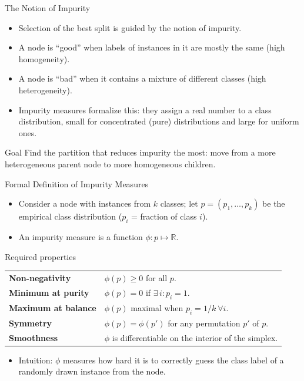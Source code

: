\begin{frame}{The Notion of Impurity}
  \begin{itemize}
    \item Selection of the best split is guided by the notion of \alert{impurity}.
    \item A node is ``good'' when labels of instances in it are mostly the same
          (\alert{high homogeneity}).
    \item A node is ``bad'' when it contains a mixture of different classes
          (\alert{high heterogeneity}).
    \item Impurity measures formalize this: they assign a real number to a class distribution,
          \alert{small for concentrated (pure) distributions} and \alert{large for uniform ones}.
  \end{itemize}
  \begin{block}{Goal}
    Find the partition that \alert{reduces impurity the most}: move from a more heterogeneous
    parent node to more homogeneous children.
  \end{block}
\end{frame}

\begin{frame}{Formal Definition of Impurity Measures}
  \begin{itemize}
    \item Consider a node with instances from $k$ classes; let $p = (p_1, \ldots, p_k)$ be the
          empirical class distribution ($p_i$ = fraction of class $i$).
    \item An impurity measure is a function $\phi: p \mapsto \mathbb{R}$.
  \end{itemize}
  \begin{block}{Required properties}
    \renewcommand{\arraystretch}{1.3}
    \begin{tabular}{ll}
      \textbf{Non-negativity} & $\phi(p) \geq 0$ for all $p$. \\
      \textbf{Minimum at purity} & $\phi(p) = 0$ if $\exists\, i: p_i = 1$. \\
      \textbf{Maximum at balance} & $\phi(p)$ maximal when $p_i = 1/k\ \forall i$. \\
      \textbf{Symmetry} & $\phi(p) = \phi(p')$ for any permutation $p'$ of $p$. \\
      \textbf{Smoothness} & $\phi$ is differentiable on the interior of the simplex.
    \end{tabular}
  \end{block}
  \begin{itemize}
    \item Intuition: $\phi$ measures how hard it is to \alert{correctly guess the class label}
          of a randomly drawn instance from the node.
  \end{itemize}
\end{frame}

